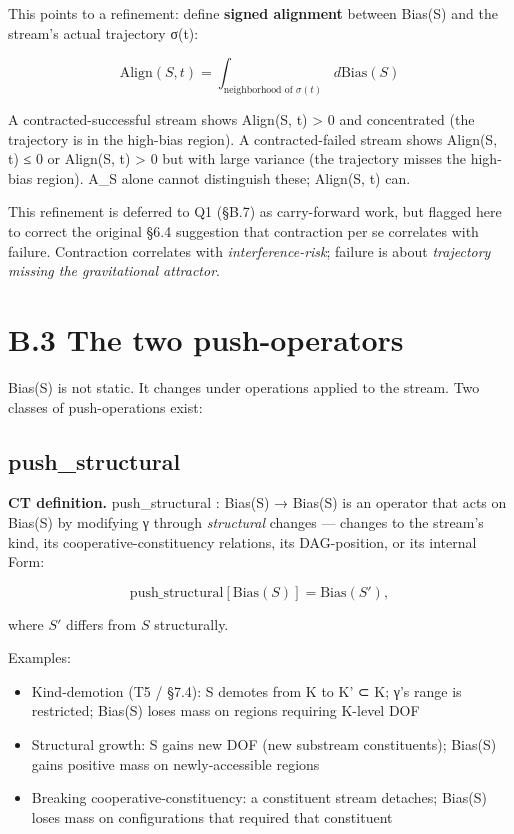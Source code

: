 \documentclass[11pt, openany]{book}
\newcommand{\sectionbreak}{\clearpage}
\begin{document}
This points to a refinement: define \textbf{signed alignment} between Bias(S) and the stream's actual trajectory σ(t):

$$\text{Align}(S, t) = \int_{\text{neighborhood of } \sigma(t)} d\text{Bias}(S)$$

A contracted-successful stream shows Align(S, t) > 0 and concentrated (the trajectory is in the high-bias region). A contracted-failed stream shows Align(S, t) ≤ 0 or Align(S, t) > 0 but with large variance (the trajectory misses the high-bias region). A\_\allowbreak{}S alone cannot distinguish these; Align(S, t) can.

This refinement is deferred to Q1 (§B.7) as carry-forward work, but flagged here to correct the original §6.4 suggestion that contraction per se correlates with failure. Contraction correlates with \textit{interference-risk}; failure is about \textit{trajectory missing the gravitational attractor}.

\sectionbreak

\section{B.3 The two push-operators}

Bias(S) is not static. It changes under operations applied to the stream. Two classes of push-operations exist:

\subsection{push\_\allowbreak{}structural}

\textbf{CT definition.} push\_\allowbreak{}structural : Bias(S) → Bias(S) is an operator that acts on Bias(S) by modifying γ through \textit{structural} changes --- changes to the stream's kind, its cooperative-constituency relations, its DAG-position, or its internal Form:

$$\text{push\_structural}[\text{Bias}(S)] = \text{Bias}(S'),$$

where $S'$ differs from $S$ structurally.

Examples:
\begin{itemize}
\item Kind-demotion (T5 / §7.4): S demotes from K to K' ⊂ K; γ's range is restricted; Bias(S) loses mass on regions requiring K-level DOF
\item Structural growth: S gains new DOF (new substream constituents); Bias(S) gains positive mass on newly-accessible regions
\item Breaking cooperative-constituency: a constituent stream detaches; Bias(S) loses mass on configurations that required that constituent
\end{itemize}
\end{document}
